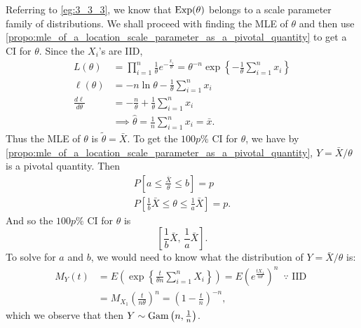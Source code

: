 \documentclass[notoc,notitlepage]{tufte-book}
\begin{document}
\begin{solution}
  Referring to \cref{eg:3_3_3}, we know that $\operatorname{Exp}(\theta)$ belongs to a scale parameter family of distributions. We shall proceed with finding the MLE of $\theta$ and then use \cref{propo:mle_of_a_location_scale_parameter_as_a_pivotal_quantity} to get a CI for $\theta$. Since the $X_i$'s are IID,
  \begin{align*}
    L(\theta) &= \prod_{i=1}^{n} \frac{1}{\theta} e^{- \frac{x_i}{\theta}} = \theta^{-n} \exp\left\{ - \frac{1}{\theta} \sum\limits_{i=1}^{n} x_i \right\} \\
    \ell(\theta) &= - n \ln \theta - \frac{1}{\theta} \sum_{i=1}^{n} x_i \\
    \frac{d \ell}{d \theta} &= - \frac{n}{\theta} + \frac{1}{\theta} \sum_{i=1}^{n} x_i \\
                            &\implies \hat{\theta} = \frac{1}{n} \sum_{i=1}^{n} x_i = \bar{x}.
  \end{align*}
  Thus the MLE of $\theta$ is $\tilde{\theta} = \bar{X}$. To get the $100p\%$ CI for $\theta$, we have by \cref{propo:mle_of_a_location_scale_parameter_as_a_pivotal_quantity}, $Y = \bar{X}/\theta$ is a pivotal quantity. Then
  \begin{gather*}
    P\left[ a \leq \frac{\bar{X}}{\theta} \leq b \right] = p \\
    P\left[ \frac{1}{b} \bar{X} \leq \theta \leq \frac{1}{a} \bar{X} \right] = p.
  \end{gather*}
  And so the $100p\%$ CI for $\theta$ is
  \begin{equation*}
    \left[ \frac{1}{b} \bar{X}, \, \frac{1}{a} \bar{X} \right].
  \end{equation*}
  To solve for $a$ and $b$, we would need to know what the distribution of $Y = \bar{X} / \theta$ is:
  \begin{align*}
    M_Y(t) &= E\left( \exp\left\{ \frac{t}{\theta n} \sum_{i=1}^{n} X_i\right\} \right) = E\left(e^{\frac{tX_1}{n \theta}}\right)^n \enspace \because \text{ IID } \\
           &= M_{X_1}\left( \frac{t}{n \theta} \right)^n = \left(1 - \frac{t}{n}\right)^{-n},
  \end{align*}
  which we observe that then $Y \sim \operatorname{Gam}\left(n, \frac{1}{n}\right)$.


\end{solution}
\end{document}
